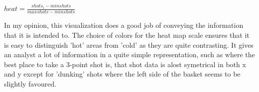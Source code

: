 \documentclass[12pt]{article}
\begin{document}
\begin{center}
	$heat = \frac{shots_i - min shots}{max shots - min shots}$
\end{center}

In my opinion, this visualization does a good job of conveying the information that it is intended to. The choice of colors for the heat map scale ensures that it is easy to distinguish 'hot' areas from 'cold' as they are quite contrasting. It gives an analyst a lot of information in a quite simple representation, such as where the best place to take a 3-point shot is, that shot data is alost symetrical in both x and y except for 'dunking' shots where the left side of the basket seems to be slightly favoured.



\end{document}
